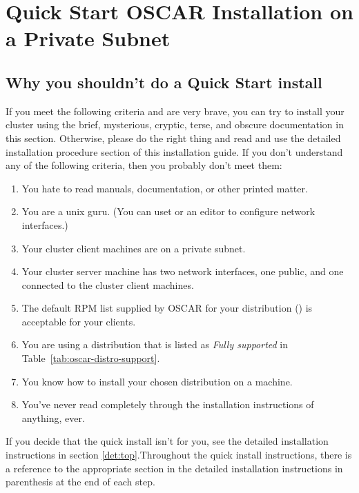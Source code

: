 %
%
%

\section{Quick Start OSCAR Installation on a Private Subnet}


\subsection{Why you shouldn't do a Quick Start install}

If you meet the following criteria and are very brave, you can 
try to install your cluster using the brief, mysterious,
cryptic, terse, and obscure documentation in this section.  
Otherwise, please do the right thing and read and use the 
detailed installation procedure section of this installation guide.
If you don't understand any of the following criteria, 
then you probably don't meet them:

\begin{enumerate}
\item You hate to read manuals, documentation, or other printed matter.
\item You are a unix guru. (You can uset  or an editor to
  configure network interfaces.)
\item Your cluster client machines are on a private subnet.
\item Your cluster server machine has two network interfaces, one public,
  and one connected to the cluster client machines.
\item The default RPM list supplied by OSCAR for your distribution
  () is
  acceptable for your clients.
\item You are using a distribution that is listed as \emph{Fully supported} 
 in Table~\ref{tab:oscar-distro-support}.
\item You know how to install your chosen distribution on a machine.
\item You've never read completely through the installation instructions
  of anything, ever. 
\end{enumerate}

If you decide that the quick install isn't for you, see the detailed installation
instructions in section \ref{det:top}.Throughout the quick install instructions,
there is a reference to the appropriate section in the detailed installation 
instructions in parenthesis at the end of each step.

